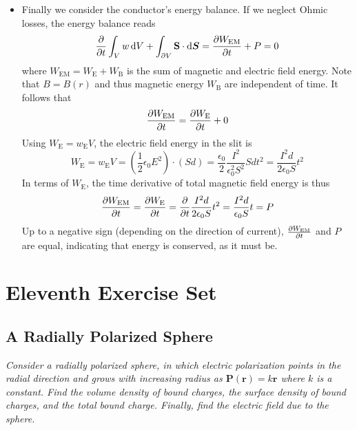 \documentclass[11pt, a4paper]{article}
\newcommand{\diff}{\mathop{}\!\mathrm{d}} %
\renewcommand{\vec}[1]{\bm{#1}} %
\renewcommand{\r}{\vec{r}}
\renewcommand{\S}{\mathbf{S}}  %
\newcommand{\ee}{\epsilon_{0}}  %
\renewcommand{\P}{\vec{P}}  %
\begin{document}
\begin{itemize}
	\item  Finally we consider the conductor's energy balance. If we neglect Ohmic losses, the energy balance reads
	\begin{equation*}
		\pdv{t}\int_{V}w \diff V + \int_{\partial V} \S \cdot \diff \vec{S} = \pdv{W_{\text{EM}}}{t} + P = 0
	\end{equation*}
	where $ W_{\text{EM}} = W_{\text{E}} + W_{\text{B}} $ is the sum of magnetic and electric field energy. Note that $ B = B(r)$  and thus magnetic energy $ W_{\text{B}} $ are independent of time. It follows that
	\begin{equation*}
		\pdv{W_{\text{EM}}}{t} = \pdv{W_{\text{E}}}{t} + 0
	\end{equation*}
	Using $ W_{\text{E}} = w_{\text{E}}V $, the electric field energy in the slit is
	\begin{equation*}
		W_{\text{E}} = w_{\text{E}}V = \left(\frac{1}{2} \ee E^{2}\right) \cdot \left(Sd\right) = \frac{\ee}{2}\frac{I^{2}}{\ee^{2}S^{2}}Sdt^{2} = \frac{I^{2}d}{2\ee S}t^{2}
	\end{equation*}
	In terms of $ W_{\text{E}} $, the time derivative of total magnetic field energy is thus
	\begin{equation*}
		\pdv{W_{\text{EM}}}{t} = \pdv{W_{\text{E}}}{t} = \pdv{t}\frac{I^{2}d}{2\ee S}t^{2} = \frac{I^{2}d}{\ee S} t = P
	\end{equation*}
	Up to a negative sign (depending on the direction of current), $ \pdv{W_{\text{EM}}}{t} $ and $ P $ are equal, indicating that energy is conserved, as it must be.
\end{itemize}

\section{Eleventh Exercise Set}

\subsection{A Radially Polarized Sphere}
\textit{Consider a radially polarized sphere, in which electric polarization points in the radial direction and grows with increasing radius as $ \P(\r) = k \r $ where $ k $ is a constant. Find the volume density of bound charges, the surface density of bound charges, and the total bound charge. Finally, find the electric field due to the sphere.}
\end{document}
